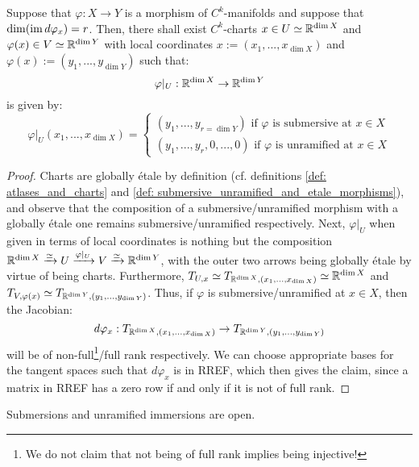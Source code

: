         \begin{theorem} \label{theorem: rank_theorem} 
            Suppose that $\varphi: X \to Y$ is a morphism of $C^k$-manifolds and suppose that $\dim(\operatorname{im} d\varphi_x) = r$. Then, there shall exist $C^k$-charts $x \in U \simeq \mathbb{R}^{\dim X}$ and $\varphi(x) \in V \simeq \mathbb{R}^{\dim Y}$ with local coordinates $x := (x_1, ..., x_{\dim X})$ and $\varphi(x) := (y_1, ..., y_{\dim Y})$ such that:
                $$\varphi|_U: \mathbb{R}^{\dim X} \to \mathbb{R}^{\dim Y}$$
            is given by:
                $$
                    \varphi|_U(x_1, ..., x_{\dim X}) =
                    \begin{cases}
                        \text{$(y_1, ..., y_{r = \dim Y})$ if $\varphi$ is submersive at $x \in X$}
                        \\
                        \text{$(y_1, ..., y_r, 0, ..., 0)$ if $\varphi$ is unramified at $x \in X$}
                    \end{cases}
                $$
        \end{theorem}
            \begin{proof}
                Charts are globally \'etale by definition (cf. definitions \ref{def: atlases_and_charts} and \ref{def: submersive_unramified_and_etale_morphisms}), and observe that the composition of a submersive/unramified morphism with a globally \'etale one remains submersive/unramified respectively. Next, $\varphi|_U$ when given in terms of local coordinates is nothing but the composition $\mathbb{R}^{\dim X} \xrightarrow[]{\simeq} U \xrightarrow[]{\varphi|_U} V \xrightarrow[]{\simeq} \mathbb{R}^{\dim Y}$, with the outer two arrows being globally \'etale by virtue of being charts. Furthermore, $T_{U, x} \simeq T_{\mathbb{R}^{\dim X}, (x_1, ..., x_{\dim X})} \simeq \mathbb{R}^{\dim X}$ and $T_{V, \varphi(x)} \simeq T_{\mathbb{R}^{\dim Y}, (y_1, ..., y_{\dim Y})}$. Thus, if $\varphi$ is submersive/unramified at $x \in X$, then the Jacobian:
                    $$d\varphi_x: T_{\mathbb{R}^{\dim X}, (x_1, ..., x_{\dim X})} \to T_{\mathbb{R}^{\dim Y}, (y_1, ..., y_{\dim Y})}$$
                will be of non-full\footnote{We do not claim that not being of full rank implies being injective!}/full rank respectively. We can choose appropriate bases for the tangent spaces such that $d\varphi_x$ is in RREF, which then gives the claim, since a matrix in RREF has a zero row if and only if it is not of full rank.
            \end{proof}
        \begin{corollary} \label{coro: submersive_and_unramified_morphisms_are_open}
            Submersions and unramified immersions are open.
        \end{corollary}
